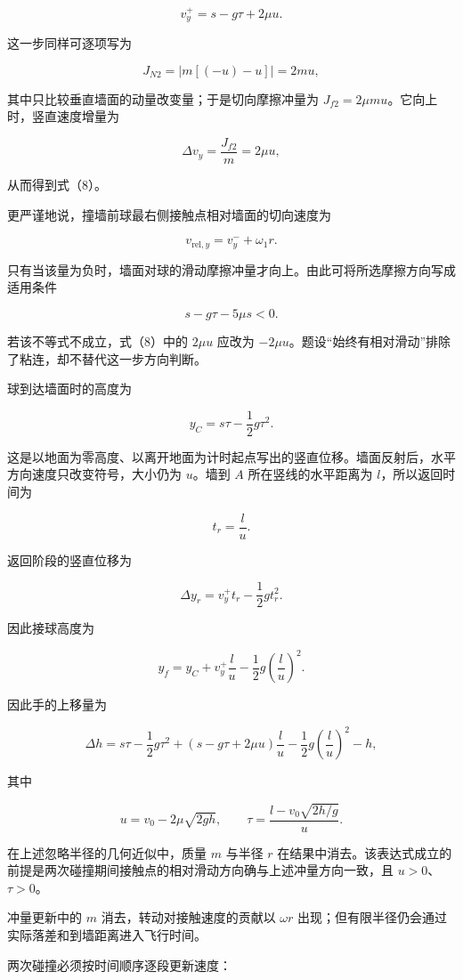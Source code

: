 \documentclass[12pt,a4paper,UTF8]{ctexart}
\begin{document}
\[v_y^+=s-g\tau+2\mu u. \tag{8}\]

这一步同样可逐项写为

\[J_{N2}=\left|m[(-u)-u]\right|=2mu,\]

其中只比较垂直墙面的动量改变量；于是切向摩擦冲量为
\(J_{f2}=2\mu m u\)。它向上时，竖直速度增量为

\[\Delta v_y=\frac{J_{f2}}m=2\mu u,\]

从而得到式（8）。

更严谨地说，撞墙前球最右侧接触点相对墙面的切向速度为

\[v_{\mathrm{rel},y}=v_y^-+\omega_1r.\]

只有当该量为负时，墙面对球的滑动摩擦冲量才向上。由此可将所选摩擦方向写成适用条件

\[s-g\tau-5\mu s<0.\]

若该不等式不成立，式（8）中的 \(2\mu u\) 应改为
\(-2\mu u\)。题设``始终有相对滑动''排除了粘连，却不替代这一步方向判断。

球到达墙面时的高度为

\[y_C=s\tau-\frac12g\tau^2.\]

这是以地面为零高度、以离开地面为计时起点写出的竖直位移。墙面反射后，水平方向速度只改变符号，大小仍为
\(u\)。墙到 \(A\) 所在竖线的水平距离为 \(l\)，所以返回时间为

\[t_r=\frac lu.\]

返回阶段的竖直位移为

\[\Delta y_r=v_y^+t_r-\frac12gt_r^2.\]

因此接球高度为

\[y_f=y_C+v_y^+\frac{l}{u}-\frac12g\left(\frac{l}{u}\right)^2.\]

因此手的上移量为

\[\boxed{\Delta h=s\tau-\frac12g\tau^2+\left(s-g\tau+2\mu u\right)\frac{l}{u}-\frac12g\left(\frac{l}{u}\right)^2-h},\]

其中

\[u=v_0-2\mu\sqrt{2gh},\qquad
\tau=\frac{l-v_0\sqrt{2h/g}}{u}.\]

在上述忽略半径的几何近似中，质量 \(m\) 与半径 \(r\)
在结果中消去。该表达式成立的前提是两次碰撞期间接触点的相对滑动方向确与上述冲量方向一致，且
\(u>0\)、\(\tau>0\)。

冲量更新中的 \(m\) 消去，转动对接触速度的贡献以 \(\omega r\)
出现；但有限半径仍会通过实际落差和到墙距离进入飞行时间。

两次碰撞必须按时间顺序逐段更新速度：
\end{document}
